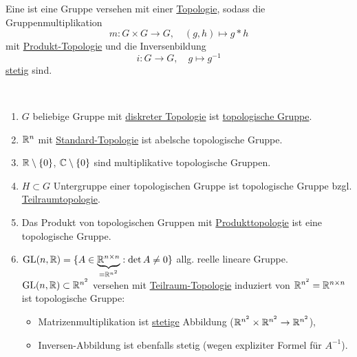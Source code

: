 \begin{remark}
  \label{exkurs:topologischeGruppe}
  Eine  ist eine Gruppe versehen mit einer \hyperref[def:topologie]{Topologie}, sodass die Gruppenmultiplikation
  \begin{equation*}
    m: G \times G \to G, \quad (g,h) \mapsto g*h
  \end{equation*}
  mit \hyperref[def:produkttopologie]{Produkt-Topologie} und die Inversenbildung
  \begin{equation*}
    i: G \to G, \quad g \mapsto g^{-1 }
  \end{equation*}
  \hyperref[def:stetig]{stetig} sind.
\end{remark}

\begin{example}
  \
  \begin{enumerate}
    \item $ G $ beliebige Gruppe mit \hyperref[bsp:diskreteTopologie]{diskreter Topologie} ist \hyperref[exkurs:topologischeGruppe]{topologische Gruppe}.
    \item $ \mathbb{R}^n $ mit \hyperref[bsp:standardtopologie]{Standard-Topologie} ist abelsche topologische Gruppe.
    \item $ \mathbb{R} \setminus \{ 0 \} $, $ \mathbb{C} \setminus \{ 0 \} $ sind multiplikative topologische Gruppen.
    \item $ H \subset G $ Untergruppe einer topologischen Gruppe ist topologische Gruppe bzgl. \hyperref[def:teilraumtopologie]{Teilraumtopologie}.
    \item Das Produkt von topologischen Gruppen mit \hyperref[def:produkttopologie]{Produkttopologie} ist eine topologische Gruppe.
    \item $ \text{GL}(n,\mathbb{R}) = \{ A \in \underbrace{\mathbb{R}^{n \times n}}_{= \mathbb{R}^{n^2}} : \det A \neq 0 \} $ allg. reelle lineare Gruppe. \\
      $ \text{GL}(n,\mathbb{R}) \subset \mathbb{R}^{n^2} $ versehen mit \hyperref[def:teilraumtopologie]{Teilraum-Topologie} induziert von $ \mathbb{R}^{n^2} = \mathbb{R}^{n \times n} $ ist topologische Gruppe:
      \begin{itemize}
        \item Matrizenmultiplikation ist \hyperref[def:stetig]{stetige} Abbildung ($ \mathbb{R}^{n^2} \times \mathbb{R}^{n^2} \to \mathbb{R}^{n^2} $),
        \item Inversen-Abbildung ist ebenfalls stetig (wegen expliziter Formel für $ A^{-1} $).
      \end{itemize}

\end{enumerate}
\end{example}
